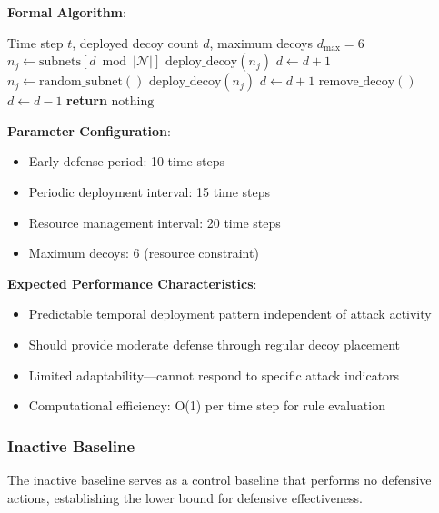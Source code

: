 \documentclass[12pt,oneside]{article}
\begin{document}
\textbf{Formal Algorithm}:
\begin{algorithm}[H]
\caption{Rule-Based Temporal Defense}
\label{alg:rule_baseline}
\begin{algorithmic}[1]
\REQUIRE Time step $t$, deployed decoy count $d$, maximum decoys $d_{\text{max}} = 6$
    \STATE $n_j \leftarrow \text{subnets}[d \bmod |\mathcal{N}|]$ 
    \STATE $\text{deploy\_decoy}(n_j)$
    \STATE $d \leftarrow d + 1$
    \STATE $n_j \leftarrow \text{random\_subnet}()$ 
    \STATE $\text{deploy\_decoy}(n_j)$
    \STATE $d \leftarrow d + 1$
    \STATE $\text{remove\_decoy}()$ 
    \STATE $d \leftarrow d - 1$
\ELSE
    \STATE \textbf{return} $\text{nothing}$ 
\ENDIF
\end{algorithmic}
\end{algorithm}

\textbf{Parameter Configuration}:
\begin{itemize}
    \item Early defense period: 10 time steps
    \item Periodic deployment interval: 15 time steps
    \item Resource management interval: 20 time steps
    \item Maximum decoys: 6 (resource constraint)
\end{itemize}

\textbf{Expected Performance Characteristics}:
\begin{itemize}
    \item Predictable temporal deployment pattern independent of attack activity
    \item Should provide moderate defense through regular decoy placement
    \item Limited adaptability—cannot respond to specific attack indicators
    \item Computational efficiency: O(1) per time step for rule evaluation
\end{itemize}

\subsubsection{Inactive Baseline}

The inactive baseline serves as a control baseline that performs no defensive actions, establishing the lower bound for defensive effectiveness.
\end{document}
